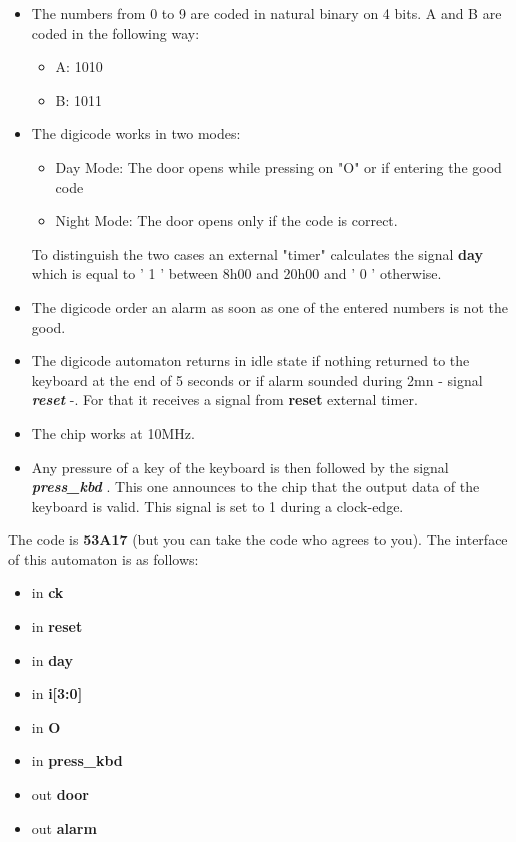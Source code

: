 \documentclass{article}
\begin{document}
{\begin{itemize}\itemsep=-.8ex
\item   The numbers from 0 to 9 are coded in natural binary on 4 bits.
    A and B are coded in the following way:
    \begin{itemize}\itemsep=-.8ex
    \item   A: 1010
    \item   B: 1011
    \end{itemize}
\item   The digicode works in two modes:
    \begin{itemize}\itemsep=-.8ex
    \item   Day Mode: The door opens while pressing on "O" or if entering the good code
    \item   Night Mode: The door opens only if the code is correct.
    \end{itemize}
    To distinguish the two cases an external "timer" calculates the signal { \bf day}
    which is equal to ' 1 ' between 8h00 and 20h00 and ' 0 ' otherwise.
\item   The digicode order an alarm as soon as one of the entered
numbers is not the good. \item   The digicode automaton returns in
idle state if nothing
    returned to the keyboard at the end of 5 seconds
        or if alarm sounded during 2mn - signal { \it \bf reset } -. For that it receives a signal
        from { \bf reset } external timer.
\item   The chip works at 10MHz.
\item   Any pressure of a key of the keyboard is then followed by the signal { \it \bf press\_kbd }.
        This one announces to the chip that the output data of the
        keyboard is valid.  This signal is set to 1 during a clock-edge.
\end{itemize}

The code is { \bf 53A17 } (but you can take the code who agrees to
you). The interface of this automaton is as follows:

\begin{itemize}\itemsep=-.8ex
\item   in {\bf ck}
\item   in {\bf reset}
\item   in {\bf day}
\item   in {\bf i[3:0]}
\item   in {\bf O}
\item   in {\bf press\_kbd}
\item   out {\bf door}
\item   out {\bf alarm}
\end{itemize}


}
\end{document}
